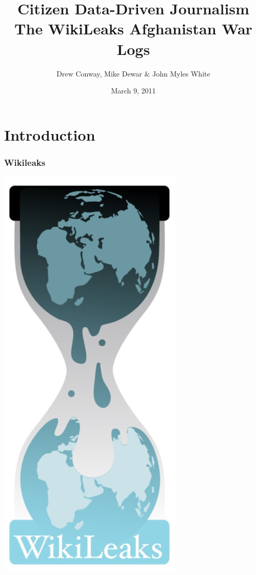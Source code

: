 \documentclass[xcolor=dvipsnames, 9pt]{beamer}
\title{Citizen Data-Driven Journalism\\The WikiLeaks Afghanistan War Logs}
\author{Drew Conway, Mike Dewar \& John Myles White}
\date{March 9, 2011}
\begin{document}
    
\ifpdf
{}
\else
{}
\fi
\graphicspath{{images/}}

\begin{frame}[plain]
  \titlepage  
\end{frame}



\section{Introduction}

\begin{frame}
	\frametitle{Wikileaks}
	\begin{center}
   \includegraphics[height=0.8\textheight]{wikileaks_eggtimer.png}
    \end{center}
\end{frame}
\end{document}
